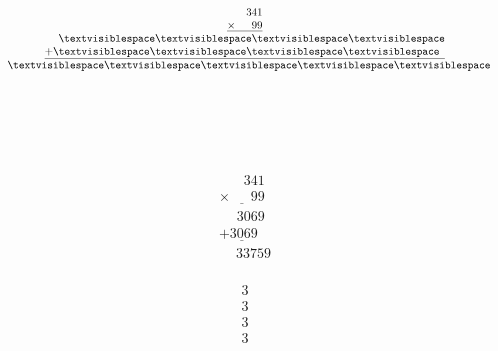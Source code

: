 \begin{minipage}[t]{0.3\linewidth}
\begin{align*}\begin{array}{c}
\phantom{
\times00
}
341\\
\underline{
\times
\phantom{
000
}
99
}\\
\phantom{
+0
}
\textvisiblespace
\textvisiblespace
\textvisiblespace
\textvisiblespace
\\
\underline{
+
\textvisiblespace
\textvisiblespace
\textvisiblespace
\textvisiblespace
\phantom0
}
\\
\phantom{+}
\textvisiblespace
\textvisiblespace
\textvisiblespace
\textvisiblespace
\textvisiblespace
\end{array}\end{align*}
\end{minipage}
\begin{minipage}[t]{0.05\linewidth}
\begin{align*}\begin{array}{c}
\textvisiblespace
\\
\textvisiblespace
\\
\textvisiblespace
\\
\textvisiblespace
\end{array}\end{align*}
\end{minipage}
\begin{minipage}[t]{0.3\linewidth}
\begin{align*}\begin{array}{c}
\phantom{
\times00
}
341\\
\underline{
\times
\phantom{
000
}
99
}\\
\phantom{
+0
}
3069
\\
\underline{
+
3069
\phantom0
}
\\
\phantom{+}
33759
\end{array}\end{align*}
\end{minipage}
\begin{minipage}[t]{0.05\linewidth}
\begin{align*}\begin{array}{c}
3
\\
3
\\
3
\\
3
\end{array}\end{align*}
\end{minipage}

